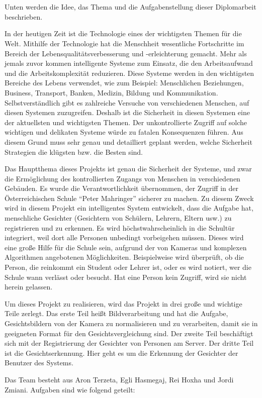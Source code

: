 \chapter{\docname}
\label{\docname}

\color{black}
Unten werden die Idee, das Thema und die Aufgabenstellung dieser Diplomarbeit beschrieben.
\begin{flushleft}
	In der heutigen Zeit ist die Technologie eines der wichtigsten Themen für die Welt. Mithilfe der Technologie hat die Menschheit wesentliche Fortschritte im Bereich der Lebensqualitätsverbesserung und -erleichterung gemacht. Mehr als jemals zuvor kommen intelligente Systeme zum Einsatz, die den Arbeitsaufwand und die Arbeitskomplexität reduzieren. Diese Systeme werden in den wichtigsten Bereiche des Lebens verwendet, wie zum Beispiel: Menschlichen Beziehungen, Business, Transport, Banken, Medizin, Bildung und Kommunikation. Selbstverständlich gibt es zahlreiche Versuche von verschiedenen Menschen, auf diesen Systemen zuzugreifen. Deshalb ist die Sicherheit in diesen Systemen eine der aktuellsten und wichtigsten Themen. Der unkontrollierte Zugriff auf solche wichtigen und delikaten Systeme würde zu fatalen Konsequenzen führen. Aus diesem Grund muss sehr genau und detailliert geplant werden, welche Sicherheit Strategien die klügsten bzw. die Besten sind.   
	
	Das Hauptthema dieses Projekts ist genau die Sicherheit der Systeme, und zwar die Ermöglichung des kontrollierten Zugangs von Menschen in verschiedenen Gebäuden. Es wurde die Verantwortlichkeit übernommen, der Zugriff in der Österreichischen Schule “Peter Mahringer” sicherer zu machen. Zu diesem Zweck wird in diesem Projekt ein intelligentes System entwickelt, dass die Aufgabe hat, menschliche Gesichter (Gesichtern von Schülern, Lehrern, Eltern usw.) zu registrieren und zu erkennen. Es wird höchstwahrscheinlich in die Schultür integriert, weil dort alle Personen unbedingt vorbeigehen müssen. Dieses wird eine große Hilfe für die Schule sein, aufgrund der von Kameras und komplexen Algorithmen angebotenen Möglichkeiten. Beispielweise wird überprüft, ob die Person, die reinkommt ein Student oder Lehrer ist, oder es wird notiert, wer die Schule wann verlässt oder besucht. Hat eine Person kein Zugriff, wird sie nicht herein gelassen.
	
	Um dieses Projekt zu realisieren, wird das Projekt in drei große und wichtige Teile zerlegt. Das erste Teil heißt Bildverarbeitung und hat die Aufgabe, Gesichtsbildern von der Kamera zu normalisieren und zu verarbeiten, damit sie in geeigneten Format für den Gesichtsvergleichung sind. Der zweite Teil beschäftigt sich mit der Registrierung der Gesichter von Personen am Server. Der dritte Teil ist die Gesichtserkennung. Hier geht es um die Erkennung der Gesichter der Benutzer des Systems. 

	
	Das Team besteht aus Aron Terzeta, Egli Hasmegaj, Rei Hoxha und Jordi Zmiani. 
	Aufgaben sind wie folgend geteilt:
\end{flushleft}
